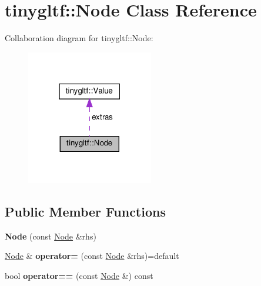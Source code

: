 \hypertarget{classtinygltf_1_1Node}{}\section{tinygltf\+:\+:Node Class Reference}
\label{classtinygltf_1_1Node}


Collaboration diagram for tinygltf\+:\+:Node\+:\nopagebreak
\begin{figure}[H]
\begin{center}
\leavevmode
\includegraphics[width=157pt]{classtinygltf_1_1Node__coll__graph}
\end{center}
\end{figure}
\subsection*{Public Member Functions}
\begin{DoxyCompactItemize}
\item 
\mbox{\label{classtinygltf_1_1Node_a829fa82bfda6b4419e8c3d4c0a617538}} 
{\bfseries Node} (const \hyperlink{classtinygltf_1_1Node}{Node} \&rhs)
\item 
\mbox{\label{classtinygltf_1_1Node_afbde0216a292bea7e4c6b321fc0928fb}} 
\hyperlink{classtinygltf_1_1Node}{Node} \& {\bfseries operator=} (const \hyperlink{classtinygltf_1_1Node}{Node} \&rhs)=default
\item 
\mbox{\label{classtinygltf_1_1Node_a02b7152ab689a494150dfb6575717de4}} 
bool {\bfseries operator==} (const \hyperlink{classtinygltf_1_1Node}{Node} \&) const
\end{DoxyCompactItemize}
